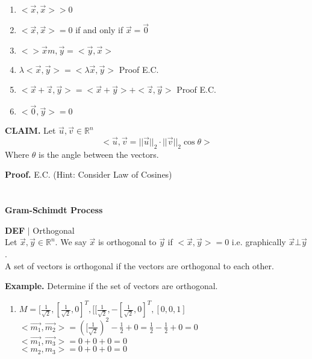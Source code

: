 \documentclass [12pt]{article}
\begin{document}
\begin{enumerate}
    \item $<\overrightarrow{x},\overrightarrow{x}> > 0$
    \item $<\overrightarrow{x},\overrightarrow{x}> = 0$ if and only if $\overrightarrow{x}=\overrightarrow{0}$
    \item $<>\overrightarrow{x}m,\overrightarrow{y} = <\overrightarrow{y},\overrightarrow{x}>$
    \item $\lambda<\overrightarrow{x},\overrightarrow{y}>=<\lambda\overrightarrow{x},\overrightarrow{y}>$ Proof E.C.
    \item $<\overrightarrow{x}+ \overrightarrow{z},\overrightarrow{y}>=<\overrightarrow{x}+\overrightarrow{y}>+<\overrightarrow{z},\overrightarrow{y}>$ Proof E.C.
    \item $<\overrightarrow{0},\overrightarrow{y}>=0$
\end{enumerate}
\begin{framed}
\noindent\textbf{CLAIM. }Let $\overrightarrow{u},\overrightarrow{v}\in\mathbb{R}^n$
\[<\overrightarrow{u},\overrightarrow{v} = ||\overrightarrow{u}||_2\cdot ||\overrightarrow{v}||_2\cos{\theta}>\]
Where $\theta$ is the angle between the vectors.
\end{framed}
\textbf{Proof.} E.C. (Hint: Consider Law of Cosines)\\
\\
\pagebreak
\\
\textbf{Gram-Schimdt Process}
\begin{framed}
\noindent\textbf{DEF} $|$ Orthogonal\\
Let $\overrightarrow{x},\overrightarrow{y}\in\mathbb{R}^n$. We say $\overrightarrow{x}$ is orthogonal to $\overrightarrow{y}$ if $<\overrightarrow{x},\overrightarrow{y}>=0$ i.e. graphically $\overrightarrow{x} \bot \overrightarrow{y}$. \\
A set of vectors is orthogonal if the vectors are orthogonal to each other.
\end{framed}
\noindent\textbf{Example. }Determine if the set of vectors are orthogonal.\\
\begin{enumerate}
    \item $M={[\frac{1}{\sqrt{2}},[\frac{1}{\sqrt{2}},0]^T,[[\frac{1}{\sqrt{2}},-[\frac{1}{\sqrt{2}},0]^T,[0,0,1]}$\\
    $<\overrightarrow{m_1},\overrightarrow{m_2}>=([\frac{1}{\sqrt{2}})^2-\frac{1}{2}+0=\frac{1}{2}-\frac{1}{2}+0=0$\\
    $<\overrightarrow{m_1},\overrightarrow{m_3}>=0+0+0=0$\\
    $<m_2,m_3>=0+0+0=0$
\end{enumerate}
\end{document}
